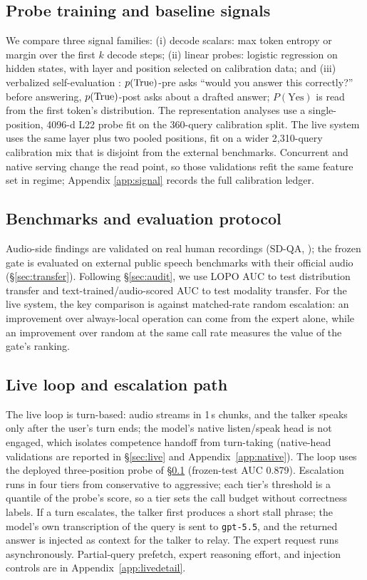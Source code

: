 \subsection{Probe training and baseline signals}
\label{sec:signals}
We compare three signal families: (i) decode scalars: max token
entropy or margin over the first $k$ decode steps; (ii) linear probes:
logistic regression on hidden states, with layer and position selected
on calibration data; and (iii) verbalized self-evaluation
\citep{kadavath2022language}: $p(\mathrm{True})$-pre asks ``would you answer this
correctly?'' before answering, $p(\mathrm{True})$-post asks about a drafted
answer; $P(\text{Yes})$ is read from the first token's distribution.
The representation analyses use a single-position, 4096-d L22 probe
fit on the 360-query calibration split. The live system uses the same
layer plus two pooled positions, fit on a wider 2{,}310-query
calibration mix that is disjoint from the external benchmarks.
Concurrent and native serving change the read point, so those
validations refit the same feature set in regime; Appendix
\ref{app:signal} records the full calibration ledger.

\subsection{Benchmarks and evaluation protocol}
\label{sec:evalproto}
Audio-side findings are validated on real human recordings (SD-QA,
\citealp{faisal2021sdqa}); the frozen gate is evaluated on external
public speech benchmarks with their official audio
(\S\ref{sec:transfer}). Following \S\ref{sec:audit}, we
use LOPO AUC to test distribution transfer and
text-trained/audio-scored AUC to test modality transfer.
For the live system, the key comparison is against matched-rate random
escalation: an improvement over always-local operation can come from
the expert alone, while an improvement over random at the same call
rate measures the value of the gate's ranking.

\subsection{Live loop and escalation path}
\label{sec:liveproto}
\label{sec:inject}
The live loop is turn-based: audio streams in 1\,s chunks, and the
talker speaks only after the user's turn ends; the model's native
listen/speak head is not engaged, which isolates competence handoff
from turn-taking (native-head validations are reported in
\S\ref{sec:live} and Appendix~\ref{app:native}). The loop uses the
deployed three-position probe of \S\ref{sec:signals} (frozen-test AUC
0.879). Escalation runs in four tiers from conservative to
aggressive; each tier's threshold is a quantile of the probe's score,
so a tier sets the call budget without correctness labels. If a turn
escalates, the talker first produces a short stall phrase; the
model's own transcription of the query is sent to \texttt{gpt-5.5},
and the returned answer is injected as context for the talker to
relay. The expert request runs asynchronously. Partial-query
prefetch, expert reasoning effort, and injection controls are in
Appendix~\ref{app:livedetail}.

